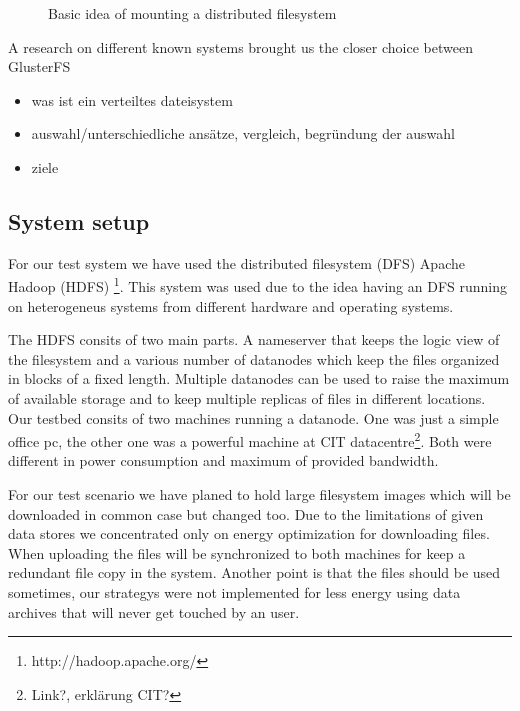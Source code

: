 \begin{figure}
\centering
\caption{Basic idea of mounting a distributed filesystem}
\label{fig:dfs_example}
\end{figure}


A research on different known systems brought us the closer choice between GlusterFS 



\begin{itemize}
\item was ist ein verteiltes dateisystem
\item auswahl/unterschiedliche ansätze, vergleich, begründung der auswahl
\item ziele
\end{itemize}


\subsection{System setup}

For our test system we have used the distributed filesystem (DFS) Apache Hadoop\textsuperscript{\textregistered} (HDFS) \footnote{http://hadoop.apache.org/}. This system was used due to the idea having an DFS running on heterogeneus systems from different hardware and operating systems. 

The HDFS consits of two main parts. A nameserver that keeps the logic view of the filesystem and a various number of datanodes which keep the files organized in blocks of a fixed length. Multiple datanodes can be used to raise the maximum of available storage and to keep multiple replicas of files in different locations. Our testbed consits of two machines running a datanode. One was just a simple office pc, the other one was a powerful machine at CIT datacentre\footnote{Link?, erklärung CIT?}. Both were different in power consumption and maximum of provided bandwidth. 


For our test scenario we have planed to hold large filesystem images which will be downloaded in common case but changed too. Due to the limitations of given data stores we concentrated only on energy optimization for downloading files. When uploading the files will be synchronized to both machines for keep a redundant file copy in the system.
Another point is that the files should be used sometimes, our strategys were not implemented for less energy using data archives that will never get touched by an user.

